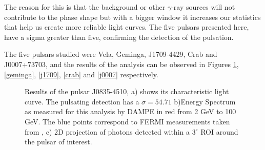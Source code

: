 \documentclass{PoS}
\begin{document}
 The reason for this is that  the background or other $\gamma$-ray sources will not contribute  to the phase shape but with a bigger window it increases our statistics that help us create more reliable  light curves. The five pulsars presented here, have a sigma greater than five, confirming the detection of the pulsation.

The five pulsars studied were Vela, Geminga, J1709-4429, Crab and J0007+73703, and the results of the analysis can be observed in Figures \ref{vela}, \ref{geminga}, \ref{j1709}, \ref{crab} and \ref{j0007} respectively.

\begin{figure}
\centering
{}
\caption{Results of the pulsar J0835-4510, a)  shows its characteristic  light curve. The pulsating detection has a $ \sigma =54.71$ b)Energy Spectrum as measured for this analysis by DAMPE in red from 2 GeV to 100 GeV. The blue points correspond to FERMI measurements taken from \cite{vela_fermi}, c) 2D projection of photons detected within a $ 3^{\circ}$ ROI around the pulsar of interest.}\label{vela}
\end{figure}
\end{document}
